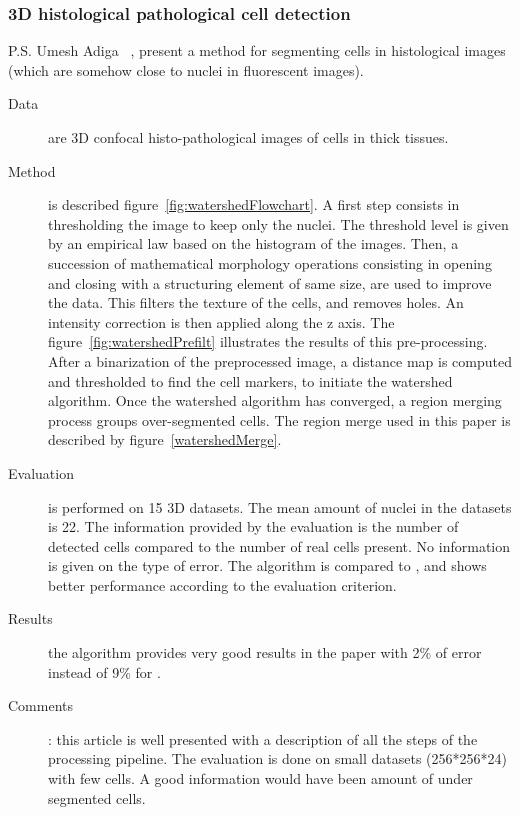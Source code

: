 \subsubsection*{3D histological pathological cell detection}
 P.S. Umesh Adiga {\etal}~\cite{umesh2001efficient}, present a method for segmenting cells in histological images 
  (which are somehow close to nuclei in fluorescent images).
  \begin{description}
  \item[Data] are 3D confocal histo-pathological images of cells in thick tissues.
  \item[Method] is described figure~\ref{fig:watershedFlowchart}.
  A first step consists in thresholding the image to keep only the nuclei. The threshold level is given by an empirical law based on the histogram of the images.
  Then, a succession of mathematical morphology operations consisting in opening and closing with a structuring element of same size, are used to improve the data. 
  This filters the texture of the cells, and removes holes.
  An intensity correction is then applied along the z axis. The figure~\ref{fig:watershedPrefilt} illustrates the results of this pre-processing.
  After a binarization of the preprocessed image, a distance map is computed and thresholded to find the cell markers, to initiate the watershed algorithm.
  Once the watershed algorithm has converged, a region merging process groups over-segmented cells. The region merge used in this paper is described by figure~\ref{watershedMerge}.
  \item[Evaluation] is performed on 15 3D datasets. The mean amount of nuclei in the datasets is 22. The information provided by the evaluation is the number of detected cells compared to the number of real cells present. No information is given on the type of error. The algorithm is compared to \cite{malpica1997applying}, and shows better performance according to the evaluation criterion.
  \item[Results] the algorithm provides very good results in the paper with 2\% of error instead of 9\% for \cite{malpica1997applying}.
  \item[Comments]: this article is well presented with a description of all the steps of the processing pipeline.
  The evaluation is done on small datasets (256*256*24) with few cells. A good information would have been amount of under segmented cells. 
\end{description}
